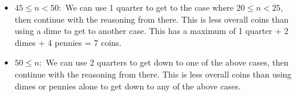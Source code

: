 \documentclass[12pt,letterpaper]{article}
\begin{document}
\begin{enumerate}
\begin{enumerate}
\begin{itemize}
            \item $45 \le n < 50 :$ We can use 1 quarter to get to the case where $20 \le n < 25$, then continue with the reasoning from there. This is less overall coins than using a dime to get to another case. This has a maximum of 1 quarter + 2 dimes + 4 pennies = 7 coins.
            \item $50 \le n:$ We can use 2 quarters to get down to one of the above cases, then continue with the reasoning from there. This is less overall coins than using dimes or pennies alone to get down to any of the above cases.
          \end{itemize}


      \end{enumerate}
  \end{enumerate}
\end{document}
